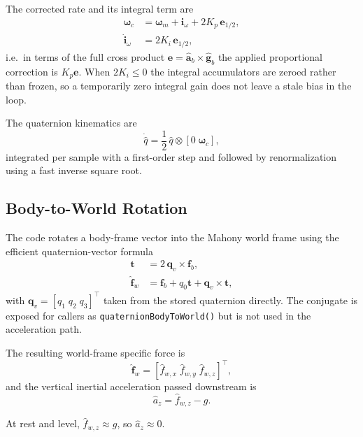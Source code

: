 \documentclass[conference]{IEEEtran}
\newcommand{\vct}[1]{\bm{#1}}
\begin{document}
    The corrected rate and its integral term are
    \begin{align}
        \vct{\omega}_c &= \vct{\omega}_m + \vct{i}_{\omega} + 2K_p\,\vct{e}_{1/2},\\
        \dot{\vct{i}}_{\omega} &= 2K_i\,\vct{e}_{1/2},
    \end{align}
    i.e.\ in terms of the full cross product
    \(\vct{e}=\hat{\vct{a}}_b\times\hat{\vct{g}}_b\) the applied proportional
    correction is \(K_p\vct{e}\). When \(2K_i \le 0\) the integral accumulators
    are zeroed rather than frozen, so a temporarily zero integral gain does not
    leave a stale bias in the loop.

    The quaternion kinematics are
    \begin{equation}
        \dot{\hat{q}}
        =
        \frac12\,\hat{q}\otimes [0\;\vct{\omega}_c],
    \end{equation}
    integrated per sample with a first-order step and followed by
    renormalization using a fast inverse square root.

    \subsection{Body-to-World Rotation}

    The code rotates a body-frame vector into the Mahony world frame using the
    efficient quaternion-vector formula
    \begin{align}
        \vct{t} &= 2\,\vct{q}_v \times \vct{f}_b,\\
        \hat{\vct{f}}_w &= \vct{f}_b + q_0\vct{t} + \vct{q}_v \times \vct{t},
    \end{align}
    with \(\vct{q}_v=[q_1\;q_2\;q_3]^\top\) taken from the stored quaternion
    directly. The conjugate is exposed for callers as
    \texttt{quaternionBodyToWorld()} but is not used in the acceleration path.

    The resulting world-frame specific force is
    \begin{equation}
        \hat{\vct{f}}_w = [\hat{f}_{w,x}\;\hat{f}_{w,y}\;\hat{f}_{w,z}]^\top,
    \end{equation}
    and the vertical inertial acceleration passed downstream is
    \begin{equation}
        \hat{a}_z = \hat{f}_{w,z} - g.
    \end{equation}

    At rest and level, \(\hat{f}_{w,z}\approx g\), so \(\hat{a}_z \approx 0\).
\end{document}
